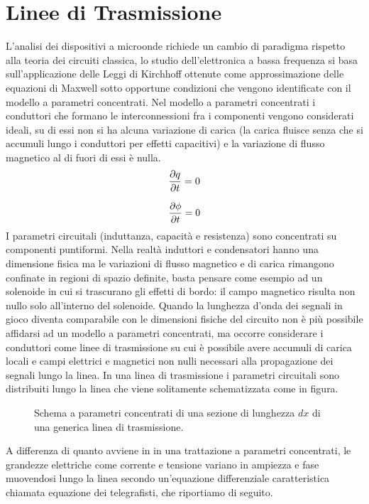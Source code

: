 \documentclass[12pt,oneside]{book}
\begin{document}
\section{Linee di Trasmissione}
L'analisi dei dispositivi a microonde richiede un cambio di paradigma rispetto alla teoria dei circuiti classica, lo studio dell'elettronica a bassa frequenza si basa sull'applicazione delle Leggi di Kirchhoff ottenute come approssimazione delle equazioni di Maxwell sotto opportune condizioni che vengono identificate con il modello a parametri concentrati.
Nel modello a parametri concentrati i conduttori che formano le interconnessioni fra i componenti vengono considerati ideali, su di essi non si ha alcuna variazione di carica (la carica fluisce senza che si accumuli lungo i conduttori per effetti capacitivi) e la variazione di flusso magnetico al di fuori di essi è nulla.
\begin{equation}
    \pdv{q}{t}=0
\end{equation}

\begin{equation}
    \pdv{\phi}{t}=0
\end{equation}
I parametri circuitali (induttanza, capacità e resistenza) sono concentrati su componenti puntiformi. Nella realtà induttori e condensatori hanno una dimensione fisica ma le variazioni di flusso magnetico e di carica rimangono confinate in regioni di spazio definite, basta pensare come esempio ad un solenoide in cui si trascurano gli effetti di bordo: il campo magnetico risulta non nullo solo all'interno del solenoide.
Quando la lunghezza d'onda dei segnali in gioco diventa comparabile con le dimensioni fisiche del circuito non è più possibile affidarsi ad un modello a parametri concentrati, ma occorre considerare i conduttori come linee di trasmissione su cui è possibile avere accumuli di carica locali e campi elettrici e magnetici non nulli necessari alla propagazione dei segnali lungo la linea.
In una linea di trasmissione i parametri circuitali sono distribuiti lungo la linea che viene solitamente schematizzata come in figura.
\begin{figure}[!htbp]
    \centering
    
    \caption{Schema a parametri concentrati di una sezione di lunghezza $dx$ di una generica linea di trasmissione.}
\end{figure} 
A differenza di quanto avviene in in una trattazione a parametri concentrati, le grandezze elettriche come corrente e tensione variano in ampiezza e fase muovendosi lungo la linea secondo un'equazione differenziale caratteristica chiamata equazione dei telegrafisti, che riportiamo di seguito.
\end{document}
